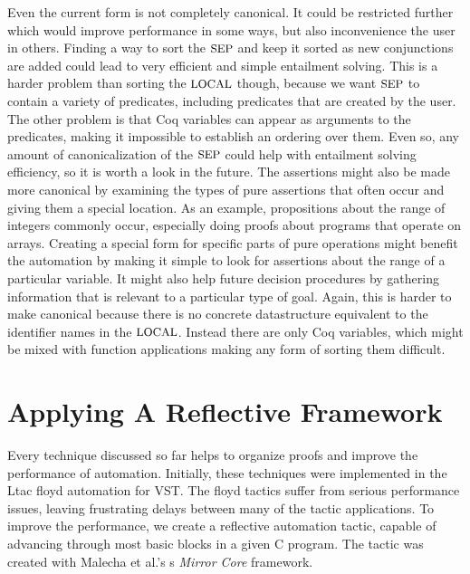 \documentclass{puthesis}
\begin{document}
Even the current form is not completely canonical. It could be
restricted further which would improve performance in some ways, but
also inconvenience the user in others. Finding a way to sort the
$\mbox{\small SEP}$ and keep it sorted as new conjunctions are added could lead to
very efficient and simple entailment solving. This is a harder problem
than sorting the $\mbox{\small LOCAL}$ though, because we want $\mbox{\small SEP}$ to contain a
variety of predicates, including predicates that are created by the
user. The other problem is that Coq variables can appear as arguments
to the predicates, making it impossible to establish an ordering over
them. Even so, any amount of canonicalization of the $\mbox{\small SEP}$ could help
with entailment solving efficiency, so it is worth a look in the
future. The assertions might also be made more canonical by examining
the types of pure assertions that often occur and giving them a
special location. As an example, propositions about the range of
integers commonly occur, especially doing proofs about programs that
operate on arrays. Creating a special form for specific parts of pure
operations might benefit the automation by making it simple to look
for assertions about the range of a particular variable. It might also
help future decision procedures by gathering information that is
relevant to a particular type of goal. Again, this is harder to
make canonical because there is no concrete datastructure equivalent
to the identifier names in the $\mbox{\small LOCAL}$. Instead there are only Coq
variables, which might be mixed with function applications making any
form of sorting them difficult. 



\chapter{Applying A Reflective Framework}
\label{ch:reflection}

Every technique discussed so far helps to organize proofs and improve
the performance of automation. Initially, these techniques were
implemented in the Ltac floyd automation for VST. The floyd tactics
suffer from serious performance issues, leaving frustrating delays
between many of the tactic applications. To improve the performance,
we create a reflective automation tactic, capable of advancing through
most basic blocks in a given C program.  The tactic was created with
Malecha et al.'s s \emph{Mirror Core} framework.
\end{document}
